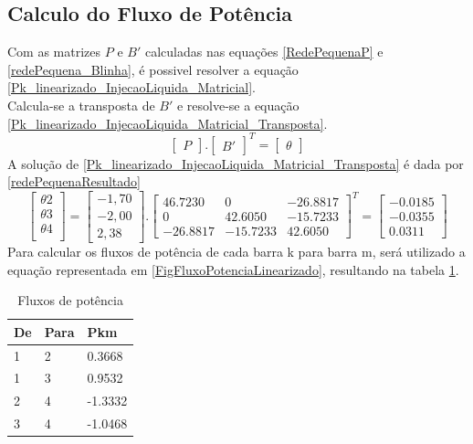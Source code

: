 \subsection{Calculo do Fluxo de Potência}
Com as matrizes $P$ e $B'$ calculadas nas equações \ref{RedePequenaP} e \ref{redePequena_Blinha}, é possivel resolver a equação \ref{Pk_linearizado_InjecaoLiquida_Matricial}.\\
Calcula-se a transposta de $B'$ e resolve-se a equação \ref{Pk_linearizado_InjecaoLiquida_Matricial_Transposta}. 
\begin{equation}
    \left[ \begin{matrix} P \end{matrix} \right] . \left[ \begin{matrix} B' \end{matrix} \right]^T=  \left[ \begin{matrix} \theta \end{matrix} \right]
    \label{Pk_linearizado_InjecaoLiquida_Matricial_Transposta}
\end{equation}
A solução de \ref{Pk_linearizado_InjecaoLiquida_Matricial_Transposta} é dada por \ref{redePequenaResultado}
\begin{equation}
    \left[ \begin{matrix} \theta 2\\ \theta 3\\ \theta 4\\  \end{matrix} \right] = \left[ 
    \begin{matrix} 
        -1,70 \\
        - 2,00 \\
        2,38
    \end{matrix} \right] . \left[ 
    \begin{matrix} 
        46.7230 &     0       & -26.8817\\
        0       &    42.6050  & -15.7233\\
        -26.8817&    -15.7233 &  42.6050
    \end{matrix} \right]^T = \left[ 
    \begin{matrix} 
   -0.0185\\
   -0.0355\\
    0.0311
    \end{matrix} \right]
    \label{redePequenaResultado}
\end{equation}
Para calcular os fluxos de potência de cada barra k para barra m, será utilizado a equação representada em \ref{FigFluxoPotenciaLinearizado}, resultando na tabela \ref{t_redePequenaResultado}.
\begin{table}[!htb]
\centering
\caption{Fluxos de potência}
\begin{tabular}{lll}
\hline
De& Para&       Pkm \\ \hline
1&    2&    0.3668 \\
1&    3&    0.9532 \\
2&    4&   -1.3332 \\
3&    4&   -1.0468 \\ \hline
\end{tabular}
\label{t_redePequenaResultado}
\end{table}

